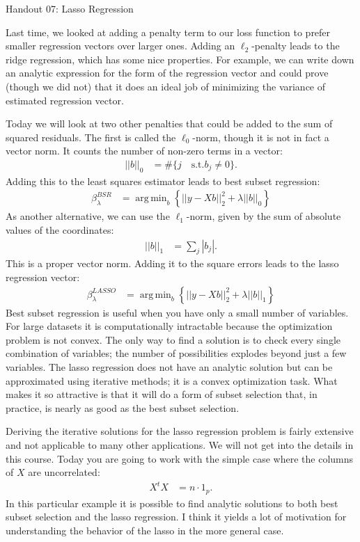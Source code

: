 \documentclass[12pt,hidelinks]{article}
\DeclareMathOperator*{\argmin}{arg\,min}
\numberwithin{equation}{section}
\begin{document}
{\LARGE Handout 07: Lasso Regression}

\vspace*{18pt}

Last time, we looked at adding a penalty term to our loss function to prefer
smaller regression vectors over larger ones. Adding an $\ell_2$-penalty leads
to the ridge regression, which has some nice properties. For example, we can
write down an analytic expression for the form of the regression vector and
could prove (though we did not) that it does an ideal job of minimizing the
variance of estimated regression vector.

Today we will look at two other penalties that could be added to the sum of
squared residuals. The first is called the $\ell_0$-norm, though it is not
in fact a vector norm. It counts the number of non-zero terms in a vector:
\begin{align}
|| b ||_0 &= \# \{ j \quad \text{s.t.} b_j \neq 0 \}.
\end{align}
Adding this to the least squares estimator leads to best subset regression:
\begin{align}
\beta^{BSR}_{\lambda} &= \argmin_b \left\{ || y - Xb||_2^2 + \lambda ||b||_0 \right\}
\end{align}
As another alternative, we can use the $\ell_1$-norm, given by the sum of
absolute values of the coordinates:
\begin{align}
|| b ||_1 &= \sum_j | b_j |.
\end{align}
This is a proper vector norm. Adding it to the square errors leads to the
lasso regression vector:
\begin{align}
\beta^{LASSO}_{\lambda} &= \argmin_b \left\{ || y - Xb||_2^2 + \lambda ||b||_1 \right\}
\end{align}
Best subset regression is useful when you have only a small number of variables.
For large datasets it is computationally intractable because the optimization
problem is not convex. The only way to find a solution is to check every single
combination of variables; the number of possibilities explodes beyond just a few
variables. The lasso regression does not have an analytic solution but can be
approximated using iterative methods; it is a convex optimization task. What
makes it so attractive is that it will do a form of subset selection that, in
practice, is nearly as good as the best subset selection.

Deriving the iterative solutions for the lasso regression problem is fairly
extensive and not applicable to many other applications. We will not get into
the details in this course. Today you are going to work with the simple case
where the columns of $X$ are uncorrelated:
\begin{align}
X^t X &= n \cdot 1_p. \label{uncor}
\end{align}
In this particular example it is possible to find analytic solutions to both
best subset selection and the lasso regression. I think it yields a lot of
motivation for understanding the behavior of the lasso in the more general
case.
\end{document}
